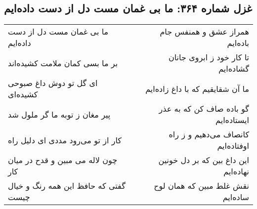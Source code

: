 \begin{center}
\section*{غزل شماره ۳۶۴: ما بی غمان مست دل از دست داده‌ایم}
\label{sec:sh364}
\begin{longtable}{l p{0.5cm} r}
ما بی غمان مست دل از دست داده‌ایم
&&
همراز عشق و همنفس جام باده‌ایم
\\
بر ما بسی کمان ملامت کشیده‌اند
&&
تا کار خود ز ابروی جانان گشاده‌ایم
\\
ای گل تو دوش داغ صبوحی کشیده‌ای
&&
ما آن شقایقیم که با داغ زاده‌ایم
\\
پیر مغان ز توبه ما گر ملول شد
&&
گو باده صاف کن که به عذر ایستاده‌ایم
\\
کار از تو می‌رود مددی ای دلیل راه
&&
کانصاف می‌دهیم و ز راه اوفتاده‌ایم
\\
چون لاله می مبین و قدح در میان کار
&&
این داغ بین که بر دل خونین نهاده‌ایم
\\
گفتی که حافظ این همه رنگ و خیال چیست
&&
نقش غلط مبین که همان لوح ساده‌ایم
\\
\end{longtable}
\end{center}
